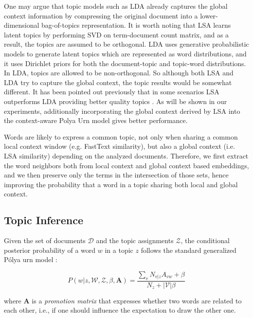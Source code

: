 \documentclass[letterpaper]{article}
\begin{document}
One may argue that topic models such as LDA already captures the global context information by compressing the original document into a lower-dimensional bag-of-topics representation. It is worth noting that LSA learns latent topics by performing SVD on term-document count matrix, and as a result, the topics are assumed to be orthogonal. LDA uses generative probabilistic models to generate latent topics which are represented as word distributions, and it uses Dirichlet priors for both the document-topic and topic-word distributions. In LDA, topics are allowed to be non-orthogonal. So although both LSA and LDA try to capture the global context, the topic results would be somewhat different. It has been pointed out previously that in some scenarios LSA outperforms LDA providing better quality topics \cite{Bergamaschi15}. As will be shown in our experiments, additionally incorporating the global context derived by LSA into the context-aware Polya Urn model gives better performance.

Words are likely to express a common topic, not only when sharing a common local context window (e.g. FastText similarity), but also a global context (i.e. LSA similarity) depending on the analyzed documents.
Therefore, we first extract the word neighbors both from local context and global context based embeddings, and we then preserve only the terms in the intersection of those sets, hence improving the probability that a word in a topic sharing both local and global context.

\subsection{Topic Inference}

Given the set of documents $\mathcal{D}$ and the topic assignments $\mathcal{Z}$, the conditional posterior probability of a word $w$ in a topic $z$ follows the standard generalized P\'{o}lya urn model \cite{Mimno11}:

\begin{equation}
P(w |z,\mathcal{W},\mathcal{Z},\beta,\mathbf{A}) = \frac{\sum_{v} N_{v|z} A_{vw} + \beta}{N_z + |\mathcal{V}|\beta}
\label{eq:gpumodel}
\end{equation}

where $\mathbf{A}$ is a \textit{promotion matrix} that expresses whether two words are related to each other, i.e., if one should influence the expectation to draw the other one.
\end{document}
